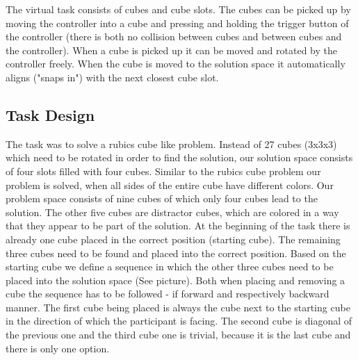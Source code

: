 \documentclass{article}
\begin{document}
The virtual task consists of cubes and cube slots. The cubes can be picked up by moving the controller into a cube and pressing and holding the trigger button of the controller (there is both no collision between cubes and between cubes and the controller). When a cube is picked up it can be moved and rotated by the controller freely. When the cube is moved to the solution space it  automatically aligns ("snaps in") with the next closest cube slot.






\subsection{Task Design}
The task was to solve a rubics cube like problem. Instead of 27 cubes (3x3x3) which need to be rotated in order to find the solution, our solution space consists of four slots filled with four cubes. Similar to the rubics cube problem our problem is solved, when all sides of the entire cube have different colors. Our problem space consists of nine cubes of which only four cubes lead to the solution. The other five cubes are distractor cubes, which are colored in a way that they appear to be part of the solution. At the beginning of the task there is already one cube placed in the correct position (starting cube). The remaining three cubes need to be found and placed into the correct position. Based on the starting cube we define a sequence in which the other three cubes need to be placed into the solution space (See picture). Both when placing and removing a cube the sequence has to be followed - if forward and respectively backward manner. The first cube being placed is always the cube next to the starting cube in the direction of which the participant is facing. The second cube is diagonal of the previous one and the third cube one is trivial, because it is the last cube and there is only one option.
\end{document}
